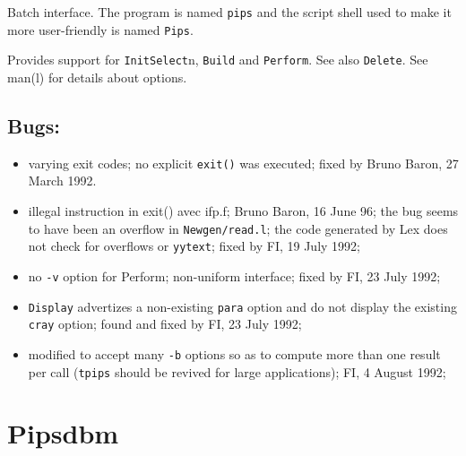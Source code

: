 Batch interface. The program is named \verb+pips+ and the script shell
used to make it more user-friendly is named \verb+Pips+.

Provides support for \verb+Init+\verb+Select+n, \verb+Build+ and
\verb+Perform+. See also \verb+Delete+. See man(l) for details about options.

\subsection{Bugs:}

\begin{itemize}

  \item varying exit codes; no explicit \verb+exit()+ was executed;
	fixed by Bruno Baron, 27 March 1992.

  \item illegal instruction in exit() avec ifp.f; Bruno Baron, 16 June 96;
	the bug seems to have been an overflow in \verb+Newgen/read.l+;
	the code generated by Lex does not check for overflows or
	\verb=yytext=;
	fixed by FI, 19 July 1992;

  \item no \verb+-v+ option for Perform; non-uniform interface;
	fixed by FI, 23 July 1992;

  \item \verb+Display+ advertizes a non-existing \verb+para+ option
	and do not display the existing \verb+cray+ option;
	found and fixed by FI, 23 July 1992;

  \item modified to accept many \verb+-b+ options so as to compute
	more than one result per call (\verb+tpips+ should be revived
	for large applications); FI, 4 August 1992;

\end{itemize}

\section{Pipsdbm}

